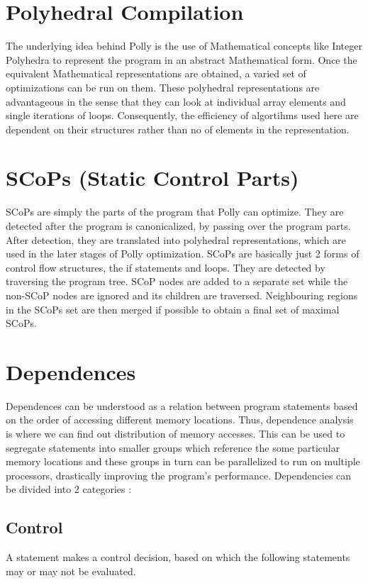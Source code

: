 \documentclass{article}
\begin{document}
\section{Polyhedral Compilation}
\hspace{10mm} The underlying idea behind Polly is the use of Mathematical concepts like Integer Polyhedra to 
represent the program in an abstract Mathematical form. Once the equivalent Mathematical representations 
are obtained, a varied set of optimizations can be run on them.
\hfill \break
\hfill \break
These polyhedral representations are advantageous in the sense that they can look at individual 
array elements and single iterations of loops. Consequently, the efficiency of algortihms used here are 
dependent on their structures rather than no of elements in the representation.

\section{SCoPs (Static Control Parts)}
\hspace{10mm} SCoPs are simply the parts of the program that Polly can optimize. They are detected after the
program is canonicalized, by passing over the program parts. After detection, they are translated into 
polyhedral representations, which are used in the later stages of Polly optimization.
\hfill \break
\hfill \break
SCoPs are basically just 2 forms of control flow structures, the if statements and loops. They are detected
by traversing the program tree. SCoP nodes are added to a separate set while the non-SCoP nodes are ignored and
its children are traversed. Neighbouring regions in the SCoPs set are then merged if possible to obtain a final
set of maximal SCoPs.

\break
\section{Dependences}
\hspace{10mm} Dependences can be understood as a relation between program statements based on the order of
accessing different memory locations. Thus, dependence analysis is where we can find out distribution of memory
accesses. This can be used to segregate statements into smaller groups which reference the some particular
memory locations and these groups in turn can be parallelized to run on multiple processors, drastically
improving the program's performance.
\hfill \break
\hfill \break
Dependencies can be divided into 2 categories :
\subsection{Control}
\hspace{10mm} A statement makes a control decision, based on which the following statements may or may not be evaluated.
\end{document}
